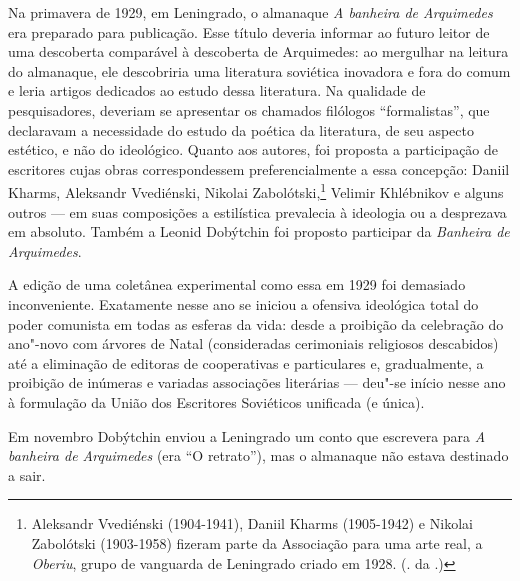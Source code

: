 \movetooddpage
\pagebreak
\begin{center}
{}
\end{center}
\label{prefacio}


Na primavera de 1929, em Leningrado, o almanaque \emph{A banheira de
Arquimedes} era preparado para publicação. Esse título deveria informar
ao futuro leitor de uma descoberta comparável à descoberta de
Arquimedes: ao mergulhar na leitura do almanaque, ele descobriria uma
literatura soviética inovadora e fora do comum e leria artigos dedicados
ao estudo dessa literatura. Na qualidade de pesquisadores, deveriam se
apresentar os chamados filólogos ``formalistas'', que declaravam a
necessidade do estudo da poética da literatura, de seu aspecto estético,
e não do ideológico. Quanto aos autores, foi proposta a participação de
escritores cujas obras correspondessem preferencialmente a essa
concepção: Daniil Kharms, Aleksandr Vvediénski, Nikolai Zabolótski,\footnote{Aleksandr Vvediénski (1904-1941), Daniil Kharms (1905-1942) e Nikolai Zabolótski (1903-1958) fizeram parte da Associação para uma arte real, a \emph{Oberiu}, grupo de vanguarda de Leningrado criado em 1928. (\scalebox{.8}{N}. da \scalebox{.8}{E}.)}
Velimir Khlébnikov e alguns outros --- em suas composições a estilística
prevalecia à ideologia ou a desprezava em absoluto. Também a Leonid
Dobýtchin foi proposto participar da \emph{Banheira de Arquimedes}.

A edição de uma coletânea experimental como essa em 1929 foi demasiado
inconveniente. Exatamente nesse ano se iniciou a ofensiva ideológica
total do poder comunista em todas as esferas da vida: desde a proibição
da celebração do ano"-novo com árvores de Natal (consideradas cerimoniais
religiosos descabidos) até a eliminação de editoras de cooperativas e
particulares e, gradualmente, a proibição de inúmeras e variadas
associações literárias --- deu"-se início nesse ano à formulação da
União dos Escritores Soviéticos unificada (e única).

Em novembro Dobýtchin enviou a Leningrado um conto que escrevera para
\emph{A banheira de Arquimedes} (era ``O retrato''), mas o almanaque não
estava destinado a sair.

